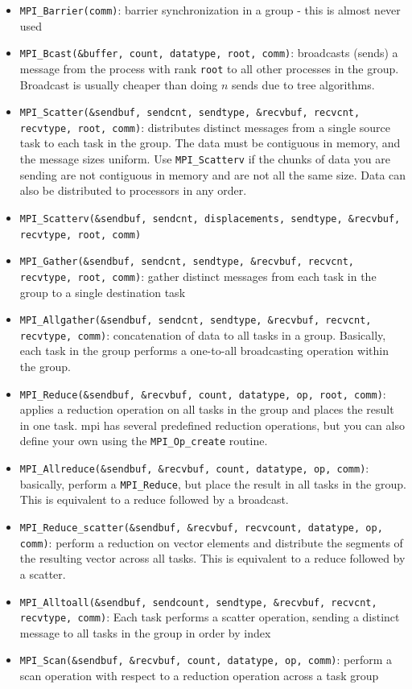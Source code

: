 \documentclass[10pt]{article}
\begin{document}
\begin{flushleft}
\begin{itemize}
\item {\tt MPI\_Barrier(comm)}: barrier synchronization in a group - this is almost never used
\item {\tt MPI\_Bcast(\&buffer, count, datatype, root, comm)}: broadcasts (sends) a message from the process with rank {\tt root} to all other processes in the group. Broadcast is usually cheaper than doing \(n\) sends due to tree algorithms.
\item {\tt MPI\_Scatter(\&sendbuf, sendcnt, sendtype, \&recvbuf, recvcnt, recvtype, root, comm)}: distributes distinct messages from a single source task to each task in the group. The data must be contiguous in memory, and the message sizes uniform. Use {\tt MPI\_Scatterv} if the chunks of data you are sending are not contiguous in memory and are not all the same size. Data can also be distributed to processors in any order. 
\item {\tt MPI\_Scatterv(\&sendbuf, sendcnt, displacements, sendtype, \&recvbuf, recvtype, root, comm)}
\item {\tt MPI\_Gather(\&sendbuf, sendcnt, sendtype, \&recvbuf, recvcnt, recvtype, root, comm)}: gather distinct messages from each task in the group to a single destination task
\item {\tt MPI\_Allgather(\&sendbuf, sendcnt, sendtype, \&recvbuf, recvcnt, recvtype, comm)}: concatenation of data to all tasks in a group. Basically, each task in the group performs a one-to-all broadcasting operation within the group. 
\item {\tt MPI\_Reduce(\&sendbuf, \&recvbuf, count, datatype, op, root, comm)}: applies a reduction operation on all tasks in the group and places the result in one task. \gls{mpi} has several predefined reduction operations, but you can also define your own using the {\tt MPI\_Op\_create} routine. 
\item {\tt MPI\_Allreduce(\&sendbuf, \&recvbuf, count, datatype, op, comm)}: basically, perform a {\tt MPI\_Reduce}, but place the result in all tasks in the group. This is equivalent to a reduce followed by a broadcast. 
\item {\tt MPI\_Reduce\_scatter(\&sendbuf, \&recvbuf, recvcount, datatype, op, comm)}: perform a reduction on vector elements and distribute the segments of the resulting vector across all tasks. This is equivalent to a reduce followed by a scatter.
\item {\tt MPI\_Alltoall(\&sendbuf, sendcount, sendtype, \&recvbuf, recvcnt, recvtype, comm)}: Each task performs a scatter operation, sending a distinct message to all tasks in the group in order by index
\item {\tt MPI\_Scan(\&sendbuf, \&recvbuf, count, datatype, op, comm)}: perform a scan operation with respect to a reduction operation across a task group
\end{itemize}


\end{flushleft}
\end{document}
